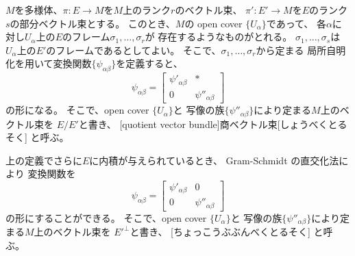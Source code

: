 \documentclass[report]{jlreq}
\begin{document}
\begin{definition}[商ベクトル束]
    $M$を多様体、$\pi \colon E \to M$を$M$上のランク$r$のベクトル束、
    $\pi' \colon E' \to M$を$E$のランク$s$の部分ベクトル束とする。
    このとき、$M$の open cover $\{U_\alpha\}$であって、
    各$\alpha$に対し$U_\alpha$上の$E$のフレーム$\sigma_1, \dots, \sigma_r$が
    存在するようなものがとれる。
    $\sigma_1, \dots, \sigma_s$は
    $U_\alpha$上の$E'$のフレームであるとしてよい。
    そこで、$\sigma_1, \dots, \sigma_r$から定まる
    局所自明化を用いて変換関数$\{ \psi_{\alpha\beta} \}$を定義すると、
    \begin{equation}
        \psi_{\alpha\beta} = \begin{bmatrix}
            \psi'_{\alpha\beta} & * \\
            0 & \psi''_{\alpha\beta}
        \end{bmatrix}
    \end{equation}
    の形になる。
    そこで、open cover $\{U_\alpha\}$と
    {\smooth}写像の族$\{ \psi''_{\alpha\beta} \}$により定まる$M$上のベクトル束を
    $E/E'$と書き、
    [quotient vector bundle]{商ベクトル束}[しょうべくとるそく]
    と呼ぶ。
\end{definition}

\begin{definition}[直交部分ベクトル束]
    上の定義でさらに$E$に内積が与えられているとき、
    Gram-Schmidt の直交化法により
    変換関数を
    \begin{equation}
        \psi_{\alpha\beta} = \begin{bmatrix}
            \psi'_{\alpha\beta} & 0 \\
            0 & \psi''_{\alpha\beta}
        \end{bmatrix}
    \end{equation}
    の形にすることができる。
    そこで、open cover $\{U_\alpha\}$と
    {\smooth}写像の族$\{ \psi''_{\alpha\beta} \}$により定まる$M$上のベクトル束を
    $E'^{\perp}$と書き、
    [ちょっこうぶぶんべくとるそく]
    と呼ぶ。
\end{definition}
\end{document}
